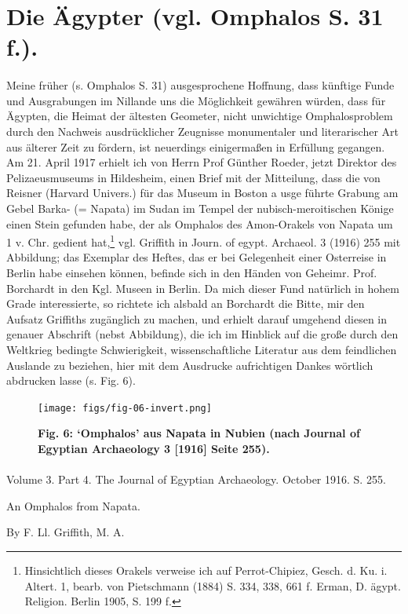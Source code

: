 \documentclass[a4paper, 11pt, oneside]{article}
\begin{document}
\section{Die Ägypter (vgl. Omphalos S. 31 f.).}
\paragraph{}
Meine früher (s. Omphalos S. 31) ausgesprochene Hoffnung, dass künftige Funde und Ausgrabungen im Nillande uns die Möglichkeit gewähren würden, dass für Ägypten, die Heimat der ältesten Geometer, nicht unwichtige Omphalosproblem durch den Nachweis ausdrücklicher Zeugnisse monumentaler und literarischer Art aus älterer Zeit zu fördern, ist neuerdings einigermaßen in Erfüllung gegangen. Am 21. April 1917 erhielt ich von Herrn Prof Günther Roeder, jetzt Direktor des Pelizaeusmuseums in Hildesheim, einen Brief mit der Mitteilung, dass die von Reisner (Harvard Univers.) für das Museum in Boston a usge führte Grabung am Gebel Barka- (= Napata) im Sudan im Tempel der nubisch-meroitischen Könige einen Stein gefunden habe, der als Omphalos des Amon-Orakels von Napata um 1 v. Chr. gedient hat,\footnote{Hinsichtlich dieses Orakels verweise ich auf Perrot-Chipiez, Gesch. d. Ku. i. Altert. 1, bearb. von Pietschmann (1884) S. 334, 338, 661 f. Erman, D. ägypt. Religion. Berlin 1905, S. 199 f.} vgl. Griffith in Journ. of egypt. Archaeol. 3 (1916) 255 mit Abbildung; das Exemplar des Heftes, das er bei Gelegenheit einer Osterreise in Berlin habe einsehen können, befinde sich in den Händen von Geheimr. Prof. Borchardt in den Kgl. Museen in Berlin. Da mich dieser Fund natürlich in hohem Grade interessierte, so richtete ich alsbald an Borchardt die Bitte, mir den Aufsatz Griffiths zugänglich zu machen, und erhielt darauf umgehend diesen in genauer Abschrift (nebst Abbildung), die ich im Hinblick auf die große durch den Weltkrieg bedingte Schwierigkeit, wissenschaftliche Literatur aus dem feindlichen Auslande zu beziehen, hier mit dem Ausdrucke aufrichtigen Dankes wörtlich abdrucken lasse (s. Fig. 6).

\begin{figure}[H]
\centering
\texttt{[image: figs/fig-06-invert.png]}
\caption{\bfseries Fig. 6: `Omphalos' aus Napata in Nubien (nach Journal of Egyptian Archaeology 3 [1916] Seite 255).}
\end{figure}
\paragraph{}
\begin{center}
Volume 3. Part 4. The Journal of Egyptian Archaeology. October 1916. S. 255.

An Omphalos from Napata.

By F. Ll. Griffith, M. A.
\end{center}
\end{document}
